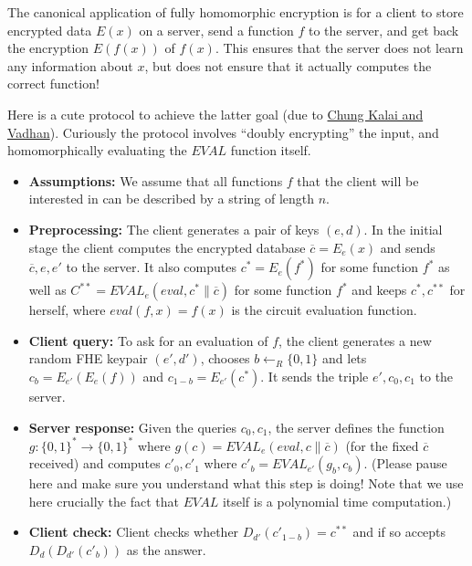 The canonical application of fully homomorphic encryption is for a
client to store encrypted data \(E(x)\) on a server, send a function
\(f\) to the server, and get back the encryption \(E(f(x))\) of
\(f(x)\). This ensures that the server does not learn any information
about \(x\), but does not ensure that it actually computes the correct
function!

Here is a cute protocol to achieve the latter goal (due to
\href{https://eprint.iacr.org/2010/241}{Chung Kalai and Vadhan}).
Curiously the protocol involves ``doubly encrypting'' the input, and
homomorphically evaluating the \(\ensuremath{\mathit{EVAL}}\) function
itself.

\begin{itemize}
\item
  \textbf{Assumptions:} We assume that all functions \(f\) that the
  client will be interested in can be described by a string of length
  \(n\).
\item
  \textbf{Preprocessing:} The client generates a pair of keys \((e,d)\).
  In the initial stage the client computes the encrypted database
  \(\overline{c}=E_e(x)\) and sends \(\overline{c},e,e'\) to the server.
  It also computes \(c^* = E_e(f^*)\) for some function \(f^*\) as well
  as \(C^{**}=\ensuremath{\mathit{EVAL}}_{e}(eval,c^*\|\overline{c})\)
  for some function \(f^*\) and keeps \(c^*,c^{**}\) for herself, where
  \(eval(f,x)=f(x)\) is the circuit evaluation function.
\item
  \textbf{Client query:} To ask for an evaluation of \(f\), the client
  generates a new random FHE keypair \((e',d')\), chooses
  \(b \leftarrow_R \{0,1\}\) and lets \(c_b = E_{e'}(E_e(f))\) and
  \(c_{1-b}=E_{e'}(c^*)\). It sends the triple \(e',c_0,c_1\) to the
  server.
\item
  \textbf{Server response:} Given the queries \(c_0,c_1\), the server
  defines the function \(g:\{0,1\}^* \rightarrow \{0,1\}^*\) where
  \(g(c)=\ensuremath{\mathit{EVAL}}_e(eval,c\|\overline{c})\) (for the
  fixed \(\overline{c}\) received) and computes \(c'_0,c'_1\) where
  \(c'_b = \ensuremath{\mathit{EVAL}}_{e'}(g_b,c_b)\). (Please pause
  here and make sure you understand what this step is doing! Note that
  we use here crucially the fact that \(\ensuremath{\mathit{EVAL}}\)
  itself is a polynomial time computation.)
\item
  \textbf{Client check:} Client checks whether
  \(D_{d'}(c'_{1-b})=c^{**}\) and if so accepts \(D_d(D_{d'}(c'_b))\) as
  the answer.
\end{itemize}

